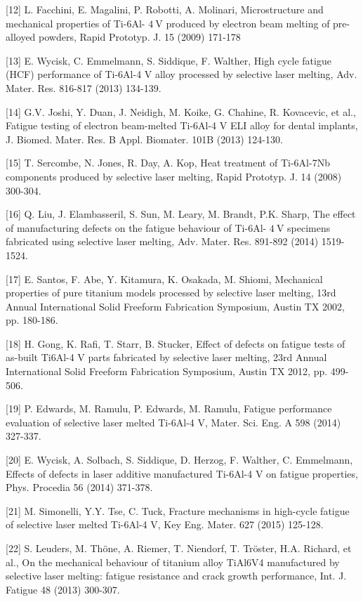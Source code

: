 \documentclass[10pt]{article}
\begin{document}
[12] L. Facchini, E. Magalini, P. Robotti, A. Molinari, Microstructure and mechanical properties of Ti-6Al- $4 \mathrm{~V}$ produced by electron beam melting of pre-alloyed powders, Rapid Prototyp. J. 15 (2009) 171-178

[13] E. Wycisk, C. Emmelmann, S. Siddique, F. Walther, High cycle fatigue (HCF) performance of Ti-6Al-4 V alloy processed by selective laser melting, Adv. Mater. Res. 816-817 (2013) 134-139.

[14] G.V. Joshi, Y. Duan, J. Neidigh, M. Koike, G. Chahine, R. Kovacevic, et al., Fatigue testing of electron beam-melted Ti-6Al-4 V ELI alloy for dental implants, J. Biomed. Mater. Res. B Appl. Biomater. 101B (2013) 124-130.

[15] T. Sercombe, N. Jones, R. Day, A. Kop, Heat treatment of Ti-6Al-7Nb components produced by selective laser melting, Rapid Prototyp. J. 14 (2008) 300-304.

[16] Q. Liu, J. Elambasseril, S. Sun, M. Leary, M. Brandt, P.K. Sharp, The effect of manufacturing defects on the fatigue behaviour of Ti-6Al- $4 \mathrm{~V}$ specimens fabricated using selective laser melting, Adv. Mater. Res. 891-892 (2014) 1519-1524.

[17] E. Santos, F. Abe, Y. Kitamura, K. Osakada, M. Shiomi, Mechanical properties of pure titanium models processed by selective laser melting, 13rd Annual International Solid Freeform Fabrication Symposium, Austin TX 2002, pp. 180-186.

[18] H. Gong, K. Rafi, T. Starr, B. Stucker, Effect of defects on fatigue tests of as-built Ti6Al-4 V parts fabricated by selective laser melting, 23rd Annual International Solid Freeform Fabrication Symposium, Austin TX 2012, pp. 499-506.

[19] P. Edwards, M. Ramulu, P. Edwards, M. Ramulu, Fatigue performance evaluation of selective laser melted Ti-6Al-4 V, Mater. Sci. Eng. A 598 (2014) 327-337.

[20] E. Wycisk, A. Solbach, S. Siddique, D. Herzog, F. Walther, C. Emmelmann, Effects of defects in laser additive manufactured Ti-6Al-4 V on fatigue properties, Phys. Procedia 56 (2014) 371-378.

[21] M. Simonelli, Y.Y. Tse, C. Tuck, Fracture mechanisms in high-cycle fatigue of selective laser melted Ti-6Al-4 V, Key Eng. Mater. 627 (2015) 125-128.

[22] S. Leuders, M. Thöne, A. Riemer, T. Niendorf, T. Tröster, H.A. Richard, et al., On the mechanical behaviour of titanium alloy TiAl6V4 manufactured by selective laser melting: fatigue resistance and crack growth performance, Int. J. Fatigue 48 (2013) 300-307.
\end{document}
